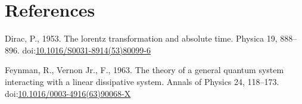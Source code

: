 \documentclass[]{elsarticle} %
\begin{document}
\hypertarget{references}{%
\section*{References}\label{references}}

\hypertarget{refs}{}
\leavevmode\hypertarget{ref-Dirac1953888}{}%
Dirac, P., 1953. The lorentz transformation and absolute time. Physica
19, 888--896.
doi:\href{https://doi.org/10.1016/S0031-8914(53)80099-6}{10.1016/S0031-8914(53)80099-6}

\leavevmode\hypertarget{ref-Feynman1963118}{}%
Feynman, R., Vernon Jr., F., 1963. The theory of a general quantum
system interacting with a linear dissipative system. Annals of Physics
24, 118--173.
doi:\href{https://doi.org/10.1016/0003-4916(63)90068-X}{10.1016/0003-4916(63)90068-X}
\end{document}
